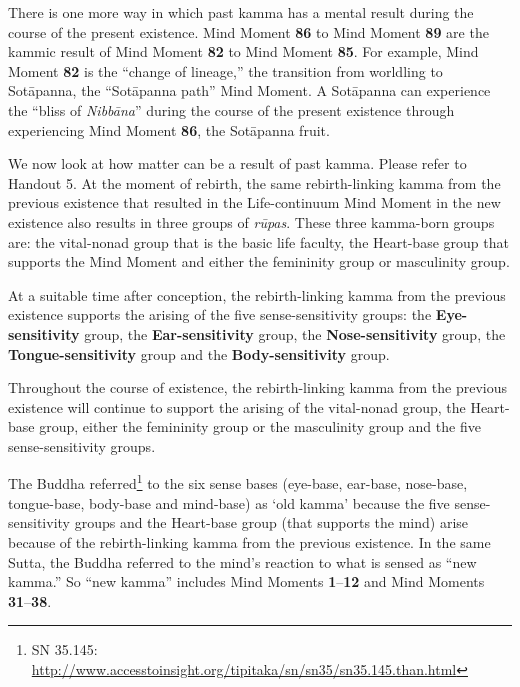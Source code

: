 There is one more way in which past kamma has a mental result during the course of the present existence. Mind Moment \textbf{86} to Mind Moment \textbf{89} are the kammic result of Mind Moment \textbf{82} to Mind Moment \textbf{85}. For example, Mind Moment \textbf{82} is the “change of lineage,” the transition from worldling to Sotāpanna, the “Sotāpanna path” Mind Moment. A Sotāpanna can experience the “bliss of \textit{Nibbāna}” during the course of the present existence through experiencing Mind Moment \textbf{86}, the Sotāpanna fruit.

We now look at how matter can be a result of past kamma. Please refer to Handout 5. At the moment of rebirth, the same rebirth-linking kamma from the previous existence that resulted in the Life-continuum Mind Moment in the new existence also results in three groups of \textit{rūpas}. These three kamma-born groups are: the vital-nonad group that is the basic life faculty, the Heart-base group that supports the Mind Moment and either the femininity group or masculinity group.

At a suitable time after conception, the rebirth-linking kamma from the previous existence supports the arising of the five sense-sensitivity groups: the \textbf{Eye-sensitivity} group, the \textbf{Ear-sensitivity} group, the \textbf{Nose-sensitivity} group, the \textbf{Tongue-sensitivity} group and the \textbf{Body-sensitivity} group.

Throughout the course of existence, the rebirth-linking kamma from the previous existence will continue to support the arising of the vital-nonad group, the Heart-base group, either the femininity group or the masculinity group and the five sense-sensitivity groups.

The Buddha referred\footnote{SN 35.145: \url{http://www.accesstoinsight.org/tipitaka/sn/sn35/sn35.145.than.html}} to the six sense bases (eye-base, ear-base, nose-base, tongue-base, body-base and mind-base) as ‘old kamma’ because the five sense-sensitivity groups and the Heart-base group (that supports the mind) arise because of the rebirth-linking kamma from the previous existence. In the same Sutta, the Buddha referred to the mind’s reaction to what is sensed as ``new kamma.'' So ``new kamma'' includes Mind Moments \textbf{1}--\textbf{12} and Mind Moments \textbf{31}--\textbf{38}.

